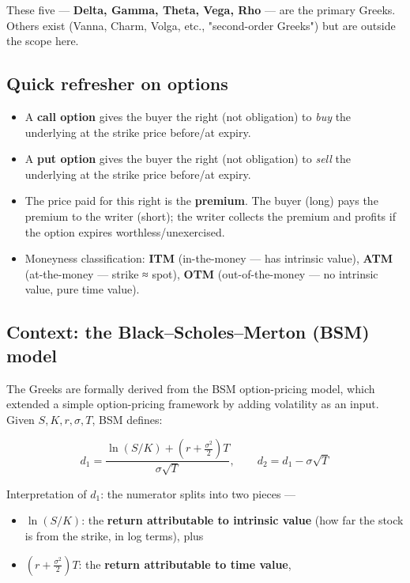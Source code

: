 \documentclass[12pt,openany]{book}
\theoremstyle{definition}
\theoremstyle{remark}
\begin{document}
These five — \textbf{Delta, Gamma, Theta, Vega, Rho} — are the primary Greeks. Others exist (Vanna, Charm, Volga, etc., "second-order Greeks") but are outside the scope here.

\subsection{Quick refresher on options}

\begin{itemize}
\item A \textbf{call option} gives the buyer the right (not obligation) to \emph{buy} the underlying at the strike price before/at expiry.
\item A \textbf{put option} gives the buyer the right (not obligation) to \emph{sell} the underlying at the strike price before/at expiry.
\item The price paid for this right is the \textbf{premium}. The buyer (long) pays the premium to the writer (short); the writer collects the premium and profits if the option expires worthless/unexercised.
\item Moneyness classification: \textbf{ITM} (in-the-money — has intrinsic value), \textbf{ATM} (at-the-money — strike ≈ spot), \textbf{OTM} (out-of-the-money — no intrinsic value, pure time value).
\end{itemize}

\subsection{Context: the Black–Scholes–Merton (BSM) model}

The Greeks are formally derived from the BSM option-pricing model, which extended a simple option-pricing framework by adding volatility as an input. Given \(S, K, r, \sigma, T\), BSM defines:

\[
d_1 = \frac{\ln(S/K) + \left(r + \frac{\sigma^2}{2}\right)T}{\sigma\sqrt{T}}, \qquad d_2 = d_1 - \sigma\sqrt{T}
\]

Interpretation of \(d_1\): the numerator splits into two pieces —
\begin{itemize}
\item \(\ln(S/K)\): the \textbf{return attributable to intrinsic value} (how far the stock is from the strike, in log terms), plus
\item \(\left(r + \frac{\sigma^2}{2}\right)T\): the \textbf{return attributable to time value},
\end{itemize}
\end{document}
